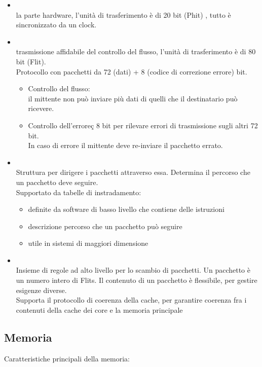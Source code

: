 \documentclass[12pt, a4paper]{article}
\begin{document}
\begin{itemize}
	\item {}\\
		la parte hardware, l'unità di trasferimento è di 20 bit (Phit)
		, tutto è sincronizzato da un clock.
	\item {}\\
		trasmissione affidabile del controllo del flusso,
		l'unità di trasferimento è di 80 bit (Flit).\\
		Protocollo con pacchetti da 72 (dati) + 8 (codice
		di correzione errore) bit.
		\begin{itemize}
			\item Controllo del flusso:\\
				il mittente non può inviare più dati di quelli
				che il destinatario può ricevere.
			\item Controllo dell'erroreç
				8 bit per rilevare errori di trasmissione 
				sugli altri 72 bit.\\
				In caso di errore il mittente deve re-inviare
				il pacchetto errato.
		\end{itemize}
	\item {}\\
		Struttura per dirigere i pacchetti attraverso essa. Determina il
		percorso che un pacchetto deve seguire.\\
		Supportato da tabelle di instradamento:\\
		\begin{itemize}
			\item definite da software di basso livello che
				contiene delle istruzioni
			\item descrizione percorso che un pacchetto può seguire
			\item utile in sistemi di maggiori dimensione
		\end{itemize}
	\item {}\\
		Insieme di regole ad alto livello per lo scambio di pacchetti.
		Un pacchetto è un numero intero di Flits. Il contenuto di 
		un pacchetto è flessibile, per gestire esigenze diverse.\\
		Supporta il protocollo di coerenza della cache, per garantire 
		coerenza fra i contenuti della cache dei core e la memoria 
		principale
\end{itemize}


\subsection{Memoria}
Caratteristiche principali della memoria:
\end{document}
